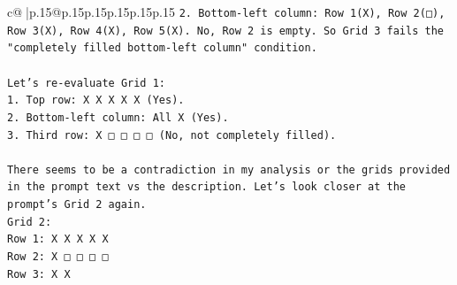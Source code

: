 \documentclass{article}
\begin{document}
{\begin{supertabular}{c@{$\;$}|p{.15\linewidth}@{}p{.15\linewidth}p{.15\linewidth}p{.15\linewidth}p{.15\linewidth}p{.15\linewidth}}
{{{\texttt{2. Bottom{-}left column: Row 1(X), Row 2(□), Row 3(X), Row 4(X), Row 5(X). No, Row 2 is empty. So Grid 3 fails the "completely filled bottom{-}left column" condition.} \\
\\ 
\texttt{Let's re{-}evaluate Grid 1:} \\
\texttt{1. Top row: X X X X X (Yes).} \\
\texttt{2. Bottom{-}left column: All X (Yes).} \\
\texttt{3. Third row: X □ □ □ □ (No, not completely filled).} \\
\\ 
\texttt{There seems to be a contradiction in my analysis or the grids provided in the prompt text vs the description. Let's look closer at the prompt's Grid 2 again.} \\
\texttt{Grid 2:} \\
\texttt{Row 1: X X X X X} \\
\texttt{Row 2: X □ □ □ □} \\
\texttt{Row 3: X X} \\
            }
        }
    }
     \\ \\

\end{supertabular}
}
\end{document}
